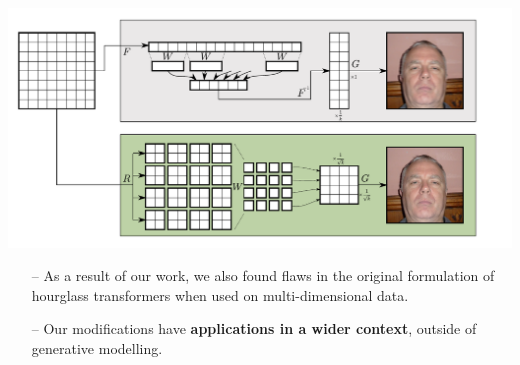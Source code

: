 \documentclass[14pt,margin=0.5in,innermargin=0in,blockverticalspace=-0.1in,colspace=-1.2cm]{tikzposter}
\begin{document}
\begin{columns}
{\begin{tcolorbox}[boxsep=0pt,top=0cm,bottom=0.6cm,adjusted title={\huge\bf Proposed Method},colbacktitle=colorOne]
        \begin{minipage}{0.75\linewidth}
        \begin{tikzfigure}
            \includegraphics[width=\linewidth]{resample.pdf}
        \end{tikzfigure}
        \end{minipage}
        \hspace{-2cm}
        \begin{minipage}{0.25\linewidth}
            \Large
            \begin{itemize}
                \item[--] As a result of our work, we also found flaws in the
                    original formulation of hourglass transformers when used on
                    multi-dimensional data.
                \item[--] Our modifications have \textbf{applications in a wider
                    context}, outside of generative modelling.
            \end{itemize}
        \end{minipage}
        \end{tcolorbox}
    }


\end{columns}
\end{document}
